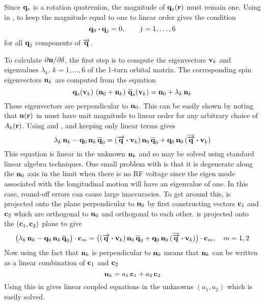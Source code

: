 Since ${\bf q}_s$ is a rotation quaternion, the magnitude of ${\bf q}_s({\bf r})$ must remain one. Using
 in , to keep the magnitude equal to one to linear order gives the condition
\begin{equation}
  {\bf q}_0 \mathbin{\boldsymbol{\cdot}} {\bf q}_j = 0, \qquad j = 1, \ldots, 6
  \label{qq0}
\end{equation}
for all ${\bf q}_j$ components of $\overrightarrow{{\bf q}}$.

To calculate $\partial{\bf n}/\partial\delta$, the first step is to compute the eigenvectors ${\bf v}_k$ and
eigenvalues $\lambda_k$, $k = 1, \ldots, 6$ of the 1-turn orbital matrix. The
corresponding spin eigenvectors ${\bf n}_k$ are computed from the equation
\begin{equation}
  \bfq_s(\bfv_k) \,\, (\bfn_0 + \bfn_k) \,\, \BAR\bfq_s(\bfv_k) = \bfn_0 + \lambda_k \, \bfn_k
  \label{qnnq}
\end{equation}
These eigenvectors are perpendicular to ${\bf n}_0$. This can be easily shown by noting that
${\bf n}({\bf r})$ in  must have unit magnitude to linear order for any arbitrary choice of
$A_k({\bf r})$. Using  and , and keeping only linear terms gives
\begin{equation}
  \lambda_k \, \bfn_k - \bfq_0 \, \bfn_k \, \BAR\bfq_0 = 
  (\arrowbfq \dotproduct \bfv_k) \, \bfn_0 \, \BAR\bfq_0 + 
  \bfq_0 \, \bfn_0 \, (\BAR\arrowbfq \dotproduct \bfv_k)
  \label{lnqnq}
\end{equation}
This equation is linear in the unknown ${\bf n}_k$ and so may be solved using standard linear
algebra techniques. One small problem with  is that it is degenerate along the ${\bf n}_0$
axis in the limit when there is no RF voltage since the eigen mode associated with the longitudinal
motion will have an eigenvalue of one. In this case, round-off errors can cause large
inaccuracies. To get around this,  is projected onto the plane perpendicular to ${\bf n}_0$
by first constructing vectors ${\bf c}_1$ and ${\bf c}_2$ which are orthogonal to ${\bf n}_0$ and orthogonal
to each other.  is projected onto the $({\bf c}_1, {\bf c}_2)$ plane to give
\begin{align}
  \big( \lambda_k \, \bfn_k - \bfq_0 \, \bfn_k \, \BAR\bfq_0 \big) \cdot \bfc_m = 
  \big( (\arrowbfq \dotproduct \bfv_k) \, \bfn_0 \, \BAR\bfq_0 + 
  \bfq_0 \, \bfn_0 \, (\BAR\arrowbfq \dotproduct \bfv_k) \big) \cdot \bfc_m,
  \quad m = 1, 2
  \label{lnqnq2}
\end{align}
Now using the fact that ${\bf n}_k$ is perpendicular to ${\bf n}_0$ means that ${\bf n}_k$ can be written as
a linear combination of ${\bf c}_1$ and ${\bf c}_2$
\begin{equation}
  {\bf n}_k = a_1 \, {\bf c}_1 + a_2 \, {\bf c}_2
\end{equation}
Using this in  gives linear coupled equations in the unknowns $(a_1, a_2)$ which is easily solved.

